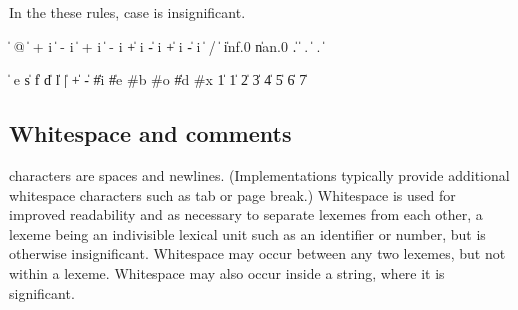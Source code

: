 In the these rules, case is insignificant.

\begin{grammar}%
 \:  
 \: %
      \|  @ 
   \> \|  +  i %
      \|  -  i
   \> \|  + i %
      \|  - i
   \> \| +  i %
      \| -  i %
      \| + i %
      \| - i
 \:  
 \: %
   \> \|  / 
   \> \|  
   \> \| inf.0 \| nan.0
 \: %
          
   \> \| .  \arbno{\#} 
   \> \|  .  \arbno{\#} 
   \> \|  \atleastone{\#} . \arbno{\#} 
 \:  \arbno{\#}
 \: %
          
   \> \|  
\end{grammar}

\begin{grammar}%
 \:  
   \> \|   
 \: e \| s \| f \| d \| l
 \: 
   \> \| | 
 \:   \| + \|  -
 \:  \| \#i \| \#e
 \: \#b
 \: \#o
 \:  \| \#d
 \: \#x
  \| 1
  \| 1 \| 2 \| 3 \| 4 \| 5 \| 6 \| 7
 \: 
 \: 
\end{grammar}


\subsection{Whitespace and comments}

 characters are spaces and newlines.
(Implementations typically provide additional whitespace characters such
as tab or page break.)  Whitespace is used for improved readability and
as necessary to separate lexemes from each other, a lexeme being an
indivisible lexical unit such as an identifier or number, but is
otherwise insignificant.  Whitespace may occur between any two lexemes,
but not within a lexeme.  Whitespace may also occur inside a string,
where it is significant.

